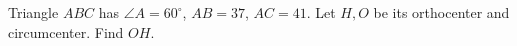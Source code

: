 Triangle $ABC$ has $\angle A=60^\circ$, $AB=37$, $AC=41$. Let $H,O$ be its orthocenter and circumcenter. Find $OH$.
